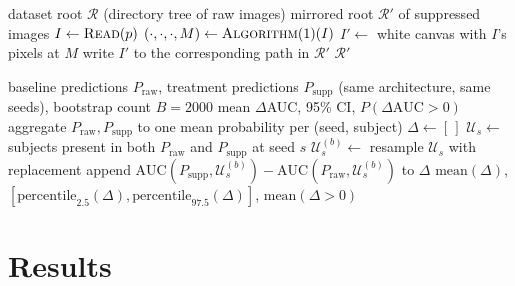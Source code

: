 \documentclass[3p,final,10pt]{elsarticle}
\let\oldsection\section
\renewcommand{\section}{\FloatBarrier\oldsection}
\begin{document}
\begin{algorithm}[H]
\caption{Background/template suppression, ``2a'' (\texttt{mech2\_suppression.py},
Section~\ref{sec:suppression})}
\label{alg:suppress}
\begin{algorithmic}[1]
\Require dataset root $\mathcal{R}$ (directory tree of raw images)
\Ensure mirrored root $\mathcal{R}'$ of suppressed images
  \State $I \gets \Call{Read}{p}$
  \State $(\cdot,\cdot,\cdot,M) \gets \Call{Algorithm}{1}(I)$
  \State $I' \gets$ white canvas with $I$'s pixels at $M$ 
  \State write $I'$ to the corresponding path in $\mathcal{R}'$
\EndFor
\State \Return $\mathcal{R}'$
\end{algorithmic}
\end{algorithm}

\begin{algorithm}[H]
\caption{Paired subject-level bootstrap $\Delta$AUC
(\texttt{compare\_2a\_vs\_baseline.py}, Section~\ref{sec:stats})}
\label{alg:boot}
\begin{algorithmic}[1]
\Require baseline predictions $P_{\mathrm{raw}}$, treatment predictions
$P_{\mathrm{supp}}$ (same architecture, same seeds), bootstrap count $B{=}2000$
\Ensure mean $\Delta$AUC, 95\% CI, $P(\Delta\mathrm{AUC}{>}0)$
\State aggregate $P_{\mathrm{raw}}, P_{\mathrm{supp}}$ to one mean probability per (seed, subject)
\State $\Delta \gets [\,]$
  \State $\mathcal{U}_s \gets$ subjects present in both $P_{\mathrm{raw}}$ and $P_{\mathrm{supp}}$ at seed $s$
    \State $\mathcal{U}_s^{(b)} \gets$ resample $\mathcal{U}_s$ with replacement
    \State append $\mathrm{AUC}(P_{\mathrm{supp}}, \mathcal{U}_s^{(b)}) - \mathrm{AUC}(P_{\mathrm{raw}}, \mathcal{U}_s^{(b)})$ to $\Delta$ 
  \EndFor
\EndFor
\State \Return $\mathrm{mean}(\Delta)$, $[\mathrm{percentile}_{2.5}(\Delta), \mathrm{percentile}_{97.5}(\Delta)]$, $\mathrm{mean}(\Delta{>}0)$
\end{algorithmic}
\end{algorithm}

\section{Results}
\end{document}
